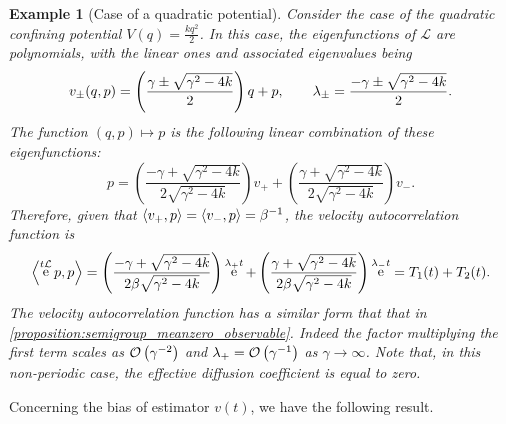 \documentclass[11pt,a4paper]{article}
\DeclareMathOperator{\e}{e}
\renewcommand{\d}{\mathrm d}
\theoremstyle{plain}
\newtheorem{example}{Example}[section]
\numberwithin{equation}{section}
\begin{document}
\begin{example}
    [Case of a quadratic potential]
    \label{example:quadratic}
    Consider the case of the quadratic confining potential $V(q) = \frac{k q^2}{2}$.
    In this case, the eigenfunctions of $\mathcal L$ are polynomials,
    with the linear ones and associated eigenvalues being
    \[
        v_{\pm}(q, p) =
        \left( \frac{\gamma \pm \sqrt{\gamma^2 - 4k}}{2} \right) q + p, \\
        \qquad
        \lambda_{\pm} = \frac{- \gamma \pm \sqrt{\gamma^2 - 4k}}{2}.
    \]
    The function $(q, p) \mapsto p$ is the following linear combination of these eigenfunctions:
    \[
        p =
        \left( \frac{-\gamma + \sqrt{\gamma^2 - 4k}}{2 \sqrt{\gamma^2 - 4k}} \right) v_+
        + \left( \frac{\gamma + \sqrt{\gamma^2 - 4k}}{2 \sqrt{\gamma^2 - 4k}} \right) v_-.
    \]
    Therefore, given that $\ip{v_+}{p} = \ip{v_-}{p} = \beta^{-1}$,
    the velocity autocorrelation function is
    \[
        \ip{\e^{t \mathcal L}p}{p} =
        \left( \frac{-\gamma + \sqrt{\gamma^2 - 4k}}{2 \beta \sqrt{\gamma^2 - 4k}} \right) \e^{\lambda_+ t} +
        \left( \frac{\gamma + \sqrt{\gamma^2 - 4k}}{2 \beta \sqrt{\gamma^2 - 4k}} \right) \e^{\lambda_- t} = T_1(t) + T_2(t).
    \]
    The velocity autocorrelation function has a similar form that that in \cref{proposition:semigroup_meanzero_observable}.
    Indeed the factor multiplying the first term scales as $\bigo{\gamma^{-2}}$
    and $\lambda_+ = \bigo {\gamma^{-1}}$ as $\gamma \to \infty$.
    Note that, in this non-periodic case, the effective diffusion coefficient is equal to zero.
\end{example}

Concerning the bias of estimator $v(t)$,
we have the following result.
\end{document}
